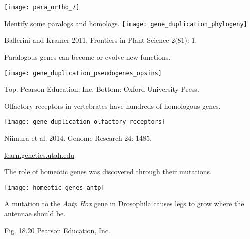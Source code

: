 \documentclass[t,handout]{beamer}  %
\begin{document}
%
\begin{frame}

	\begin{overprint}
		\texttt{[image: para\_ortho\_7]}
	\end{overprint}
	
\end{frame}
%
\begin{frame}[t]{Identify some paralogs and homologs.}
	\texttt{[image: gene\_duplication\_phylogeny]}
	
	\vfilll
	
	\hfill \tiny Ballerini and Kramer 2011. Frontiers in Plant Science 2(81): 1.
\end{frame}
%
\begin{frame}[t]{Paralogous genes can become  or evolve new functions.}
	
	\texttt{[image: gene\_duplication\_pseudogenes\_opsins]}\\
	
	\vfilll
	 
	\hfill \tiny Top: \textcopyright Pearson Education, Inc. Bottom: \textcopyright Oxford University Press.
\end{frame}
%
\begin{frame}[t]{Olfactory receptors in vertebrates have hundreds of homologous genes.}
	
	\texttt{[image: gene\_duplication\_olfactory\_receptors]}\\
	
	\vfilll
	 
	\hfill \tiny Niimura et al. 2014. Genome Research 24: 1485.
\end{frame}
%
{
\begin{frame}[b]

	\hfill \tiny \href{http://learn.genetics.utah.edu/basics/hoxgenes}{learn.genetics.utah.edu}
\end{frame}
}
%
\begin{frame}[t]{The role of homeotic genes was discovered through their mutations.}
	\vspace*{-0.5\baselineskip}
	\begin{center}
		\texttt{[image: homeotic\_genes\_antp]}
	\end{center}
	
	A mutation to the \textit{Antp} \textit{Hox} gene in Drosophila causes legs to grow where the antennae should be.
	\vfilll

	\hfill \tiny Fig. 18.20 \textcopyright Pearson Education, Inc.
\end{frame}
\end{document}
